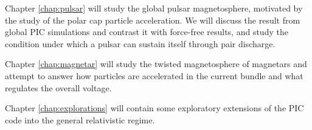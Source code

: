 Chapter \ref{chap:pulsar} will study the global pulsar magnetosphere, motivated
by the study of the polar cap particle acceleration. We will discuss the
result from global PIC simulations and contrast it with force-free results, and
study the condition under which a pulsar can sustain itself through pair discharge.

Chapter \ref{chap:magnetar} will study the twisted magnetosphere of magnetars
and attempt to answer how particles are accelerated in the current bundle and
what regulates the overall voltage.

Chapter \ref{chap:explorations} will contain some exploratory extensions of the
PIC code into the general relativistic regime.

